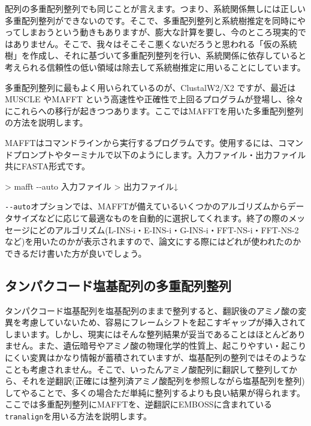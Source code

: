 \documentclass[titlepage,10pt,a4paper]{jsbook}
\newenvironment{cmd}{\begin{oframed}\raggedright\ttfamily\footnotesize\setlength{\baselineskip}{1.4em}}{\end{oframed}\vspace{-1em}}
\begin{document}
配列の多重配列整列でも同じことが言えます。つまり、系統関係無しには正しい多重配列整列ができないのです。そこで、多重配列整列と系統樹推定を同時にやってしまおうという動きもあります\citep[例えば][など]{Fleissner2005,Lunter2005,Redelings2005}が、膨大な計算を要し、今のところ現実的ではありません。そこで、我々はそこそこ悪くないだろうと思われる「仮の系統樹」を作成し、それに基づいて多重配列整列を行い、系統関係に依存していると考えられる信頼性の低い領域は除去して系統樹推定に用いることにしています。

多重配列整列に最もよく用いられているのが、ClustalW2/X2 \citep{Larkin2007}ですが、最近はMUSCLE \citep{Edgar2004}やMAFFT \citep{Katoh2005}という高速性や正確性で上回るプログラムが登場し、徐々にこれらへの移行が起きつつあります。ここではMAFFTを用いた多重配列整列の方法を説明します。

MAFFTはコマンドラインから実行するプログラムです。使用するには、コマンドプロンプトやターミナルで以下のようにします。入力ファイル・出力ファイル共にFASTA形式です。
\begin{cmd}
{\textgreater} mafft {-}{-}auto 入力ファイル > 出力ファイル↓
\end{cmd}
\texttt{{-}{-}auto}オプションでは、MAFFTが備えているいくつかのアルゴリズムからデータサイズなどに応じて最適なものを自動的に選択してくれます。終了の際のメッセージにどのアルゴリズム(L-INS-i・E-INS-i・G-INS-i・FFT-NS-i・FFT-NS-2など)を用いたのかが表示されますので、論文にする際にはどれが使われたのかできるだけ書いた方が良いでしょう。

\subsection{タンパクコード塩基配列の多重配列整列}

タンパクコード塩基配列を塩基配列のままで整列すると、翻訳後のアミノ酸の変異を考慮していないため、容易にフレームシフトを起こすギャップが挿入されてしまいます。しかし、現実にはそんな整列結果が妥当であることはほとんどありません。また、遺伝暗号やアミノ酸の物理化学的性質上、起こりやすい・起こりにくい変異はかなり情報が蓄積されていますが、塩基配列の整列ではそのようなことも考慮されません。そこで、いったんアミノ酸配列に翻訳して整列してから、それを逆翻訳(正確には整列済アミノ酸配列を参照しながら塩基配列を整列)してやることで、多くの場合ただ単純に整列するよりも良い結果が得られます。ここでは多重配列整列にMAFFTを、逆翻訳にEMBOSSに含まれている\texttt{tranalign}を用いる方法を説明します。
\end{document}
